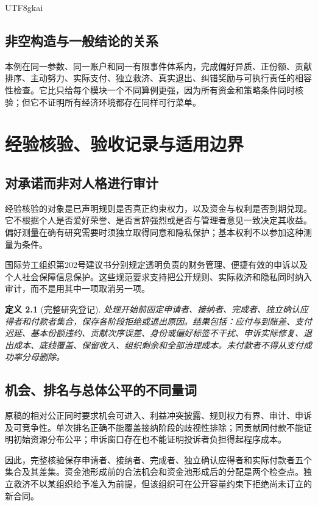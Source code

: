 \documentclass[12pt,a4paper,openany]{report}
\newtheorem{definition}{定义}[chapter]
\begin{document}
\begin{CJK*}{UTF8}{gkai}
\section{非空构造与一般结论的关系}
本例在同一参数、同一账户和同一有限事件体系内，完成偏好异质、正份额、贡献排序、主动努力、实际支付、独立救济、真实退出、纠错奖励与可执行责任的相容性检查。它比只给每个模块一个不同算例更强，因为所有资金和策略条件同时核验；但它不证明所有经济环境都存在同样可行菜单。
\chapter{经验核验、验收记录与适用边界}
\label{chap:validation}
\section{对承诺而非对人格进行审计}
经验核验的对象是已声明规则是否真正约束权力，以及资金与权利是否到期兑现。它不根据个人是否爱好荣誉、是否言辞强烈或是否与管理者意见一致决定其收益。偏好测量在确有研究需要时须独立取得同意和隐私保护；基本权利不以参加这种测量为条件。

国际劳工组织第202号建议书分别规定透明负责的财务管理、便捷有效的申诉以及个人社会保障信息保护\cite[第3、7、23段]{ILO202}。这些规范要求支持把公开规则、实际救济和隐私同时纳入审计，而不是用其中一项取消另一项。

\begin{definition}[完整研究登记]
\label{def:empirical}
处理开始前固定申请者、接纳者、完成者、独立确认应得者和付款者集合，保存各阶段拒绝或退出原因。结果包括：应付与到账差、支付迟延、基本份额违约、贡献次序误差、身份或偏好标签不干扰、申诉实际修复、退出成本、底线覆盖、保留收入、组织剩余和全部治理成本。未付款者不得从支付成功率分母删除。
\end{definition}

\section{机会、排名与总体公平的不同量词}
原稿的相对公正同时要求机会可进入、利益冲突披露、规则权力有界、审计、申诉及可竞争性\cite{SourceMarket}。单次排名正确不能覆盖接纳阶段的歧视性排除；同贡献同付款不能证明初始资源分布公平；申诉窗口存在也不能证明投诉者负担得起程序成本。

因此，完整核验保存申请者、接纳者、完成者、独立确认应得者和实际付款者五个集合及其差集。资金池形成前的合法机会和资金池形成后的分配是两个检查点。独立救济不以某组织给予准入为前提，但该组织可在公开容量约束下拒绝尚未订立的新合同。


\end{CJK*}
\end{document}
